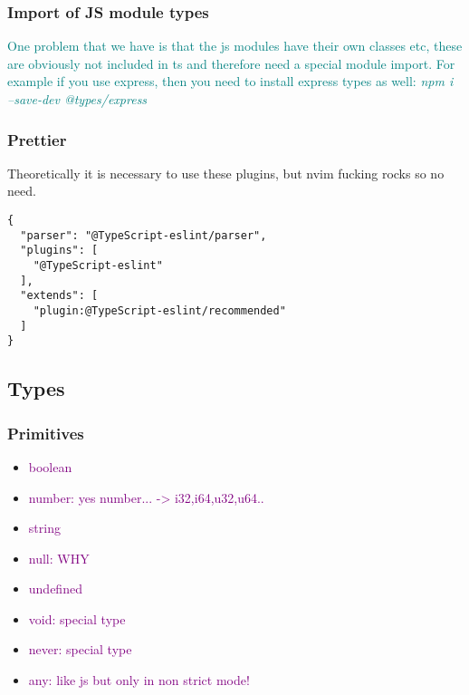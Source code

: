 \documentclass[main.tex,fontsize=8pt,paper=a4,paper=portrait,DIV=calc,]{scrartcl}
\begin{document}
\subsubsection{Import of JS module types}
\textcolor{teal}{One problem that we have is that the js modules have their own classes etc, these are obviously not included in ts and therefore need a special module import.\newline
For example if you use express, then you need to install express types as well: \emph{npm i --save-dev @types/express}}

\subsubsection{Prettier}
Theoretically it is necessary to use these plugins, but nvim fucking rocks so no need. 
\begin{lstlisting}
{
  "parser": "@TypeScript-eslint/parser",
  "plugins": [
    "@TypeScript-eslint"
  ],
  "extends": [
    "plugin:@TypeScript-eslint/recommended"
  ]
}
\end{lstlisting}

\subsection{Types}

\subsubsection{Primitives}
\begin{itemize}
\item \textcolor{purple}{boolean}
\item \textcolor{purple}{number: yes number... -> i32,i64,u32,u64..}
\item \textcolor{purple}{string}
\item \textcolor{purple}{null: WHY}
\item \textcolor{purple}{undefined}
\item \textcolor{purple}{void: special type}
\item \textcolor{purple}{never: special type}
\item \textcolor{purple}{any: like js but only in non strict mode!}
\end{itemize} 
\end{document}
